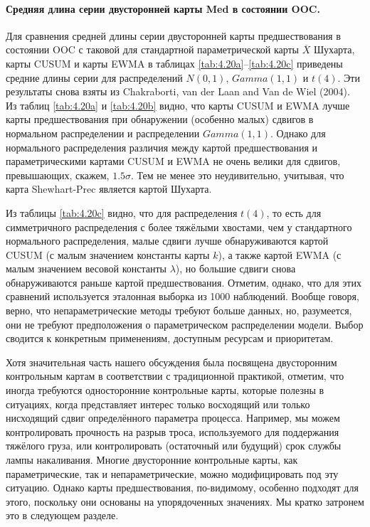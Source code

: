 \paragraph{Средняя длина серии двусторонней карты Med в состоянии OOC.} Для сравнения средней длины серии двусторонней карты предшествования в состоянии OOC с таковой для стандартной параметрической карты \(\overline{X}\) Шухарта, карты CUSUM и карты EWMA в таблицах \ref{tab:4.20a}--\ref{tab:4.20c} приведены средние длины серии для распределений \(N(0, 1)\), \(Gamma(1, 1)\) и \(t(4)\). Эти результаты снова взяты из Chakraborti, van der Laan and Van de Wiel (2004). Из таблиц \ref{tab:4.20a} и \ref{tab:4.20b} видно, что карты CUSUM и EWMA лучше карты предшествования при обнаружении (особенно малых) сдвигов в нормальном распределении и распределении \(Gamma(1, 1)\). Однако для нормального распределения различия между картой предшествования и параметрическими картами CUSUM и EWMA не очень велики для сдвигов, превышающих, скажем, \(1.5\sigma\). Тем не менее это неудивительно, учитывая, что карта Shewhart-Prec является картой Шухарта.

Из таблицы \ref{tab:4.20c} видно, что для распределения \(t(4)\), то есть для симметричного распределения с более тяжёлыми хвостами, чем у стандартного нормального распределения, малые сдвиги лучше обнаруживаются картой CUSUM (с малым значением константы карты \(k\)), а также картой EWMA (с малым значением весовой константы \(\lambda\)), но большие сдвиги снова обнаруживаются раньше картой предшествования. Отметим, однако, что для этих сравнений используется эталонная выборка из 1000 наблюдений. Вообще говоря, верно, что непараметрические методы требуют больше данных, но, разумеется, они не требуют предположения о параметрическом распределении модели. Выбор сводится к конкретным применениям, доступным ресурсам и приоритетам.

Хотя значительная часть нашего обсуждения была посвящена двусторонним контрольным картам в соответствии с традиционной практикой, отметим, что иногда требуются односторонние контрольные карты, которые полезны в ситуациях, когда представляет интерес только восходящий или только нисходящий сдвиг определённого параметра процесса. Например, мы можем контролировать прочность на разрыв троса, используемого для поддержания тяжёлого груза, или контролировать (остаточный или будущий) срок службы лампы накаливания. Многие двусторонние контрольные карты, как параметрические, так и непараметрические, можно модифицировать под эту ситуацию. Однако карты предшествования, по-видимому, особенно подходят для этого, поскольку они основаны на упорядоченных значениях. Мы кратко затронем это в следующем разделе.

